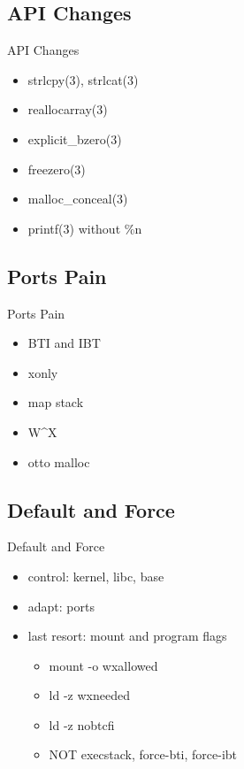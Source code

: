 \documentclass[14pt,aspectratio=169]{beamer}
\begin{document}
\subsection{API Changes}
\begin{frame}{API Changes}
\begin{itemize}
  \item strlcpy(3), strlcat(3)
  \item reallocarray(3)
  \item explicit\_bzero(3)
  \item freezero(3)
  \item malloc\_conceal(3)
  \item printf(3) without \%n
\end{itemize}
\end{frame}

\subsection{Ports Pain}
\begin{frame}{Ports Pain}
\begin{itemize}
  \item BTI and IBT
  \item xonly
  \item map stack
  \item W\^{}X
  \item otto malloc
\end{itemize}
\end{frame}

\subsection{Default and Force}
\begin{frame}{Default and Force}
\begin{itemize}
  \item control: kernel, libc, base
  \item adapt: ports
  \item last resort: mount and program flags
  \begin{itemize}
    \item mount -o wxallowed
    \item ld -z wxneeded
    \item ld -z nobtcfi
    \item NOT execstack, force-bti, force-ibt
  \end{itemize}
\end{itemize}
\end{frame}
\end{document}
